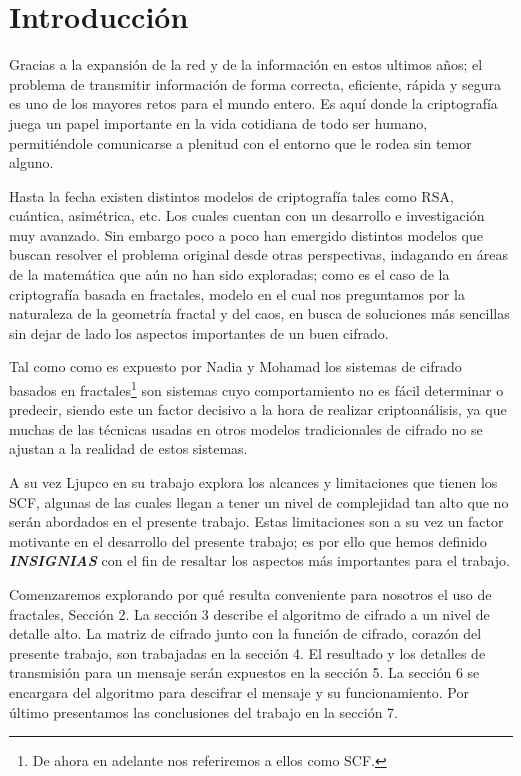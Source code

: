 \section{Introducci\'on}
Gracias a la expansi\'on de la red y de la informaci\'on en estos ultimos a\~nos; el problema de transmitir informaci\'on de forma correcta, eficiente, r\'apida y segura es uno de los mayores retos para el mundo entero. Es aqu\'i donde la criptograf\'ia juega un papel importante en la vida cotidiana de todo ser humano, permiti\'endole comunicarse a plenitud con el entorno que le rodea sin temor alguno. 

Hasta la fecha existen distintos modelos de criptograf\'ia tales como RSA, cu\'antica, asim\'etrica, etc. Los cuales cuentan con un desarrollo e investigaci\'on muy avanzado. Sin embargo poco a poco han emergido distintos modelos que buscan resolver el problema original desde otras perspectivas, indagando en \'areas de la matem\'atica que a\'un no han sido exploradas; como es el caso de la criptograf\'ia basada en fractales, modelo en el cual nos preguntamos por la naturaleza de la geometr\'ia fractal y del caos, en busca de soluciones m\'as sencillas sin dejar de lado los aspectos importantes de un buen cifrado.

Tal como como es expuesto por Nadia y Mohamad \cite{Nadia} los sistemas de cifrado basados en fractales\footnote{De ahora en adelante nos referiremos a ellos como SCF.} son sistemas cuyo comportamiento no es f\'acil determinar o predecir, siendo este un factor decisivo a la hora de realizar criptoan\'alisis, ya que muchas de las t\'ecnicas usadas en otros modelos tradicionales de cifrado no se ajustan a la realidad de estos sistemas.

A su vez Ljupco \cite{Ljupco} en su trabajo explora los alcances y limitaciones que tienen los SCF, algunas de las cuales llegan a tener un nivel de complejidad tan alto que no ser\'an abordados en el presente trabajo. Estas limitaciones son a su vez un factor motivante en el desarrollo del presente trabajo; es por ello que hemos definido \textbf{\emph{INSIGNIAS}} con el fin de resaltar los aspectos m\'as importantes para el trabajo.

Comenzaremos explorando por qu\'e resulta conveniente para nosotros el uso de fractales, Secci\'on 2. La secci\'on 3 describe el algoritmo de cifrado a un nivel de detalle alto. La matriz de cifrado junto con la funci\'on de cifrado, coraz\'on del presente trabajo, son trabajadas en la secci\'on 4. El resultado y los detalles de transmisi\'on para un mensaje ser\'an expuestos en la secci\'on 5. La secci\'on 6 se encargara del algoritmo para descifrar el mensaje y su funcionamiento. Por \'ultimo presentamos las conclusiones del trabajo en la secci\'on 7.

